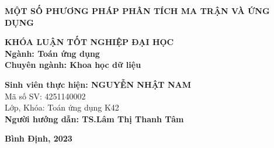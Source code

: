 \documentclass[12pt,a4paper,oneside]{report}
\numberwithin{equation}{section}
\begin{document}
\vskip 3cm
\begin{center}
{\bf\fontsize{22pt}{22}\selectfont MỘT SỐ PHƯƠNG PHÁP PHÂN TÍCH MA TRẬN VÀ ỨNG DỤNG}



\vskip 3.5cm
{\bf\fontsize{16pt}{22}\selectfont KHÓA LUẬN TỐT NGHIỆP ĐẠI HỌC}\\
\vskip 0.5cm
{\bf\fontsize{16pt}{22}\selectfont Ngành: Toán ứng dụng}\\
\vskip 0.05cm
{\bf\fontsize{16pt}{22}\selectfont Chuyên ngành: Khoa học dữ liệu}\\
\vskip 2.5cm
\end{center}
\begin{flushleft}
{\bf\fontsize{16pt}{22}\selectfont Sinh viên thực hiện:  NGUYỄN NHẬT NAM}\\
\vskip 0.05cm
{\fontsize{16pt}{22}\selectfont Mã số SV: 4251140002}\\
\vskip 0.05cm
{\fontsize{16pt}{22}\selectfont Lớp, Khóa: Toán ứng dụng K42}\\
\vskip 2cm
{\bf\fontsize{16pt}{22}\selectfont Người hướng dẫn: TS.Lâm Thị Thanh Tâm}\\
\end{flushleft}


\vfill
\begin{center}
	{\bf\fontsize{14pt}{16pt}\selectfont Bình Định, 2023}
\end{center}
%
%	
%
%
\end{document}
